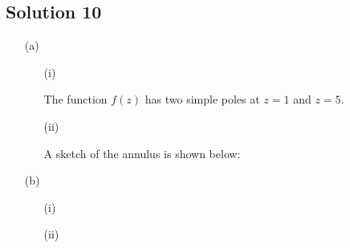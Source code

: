 \subsection*{Solution 10}

\begin{itemize}
\item[(a)]

\begin{itemize}

\item[(i)]

The function $f(z)$ has two simple poles at $z=1$ and $z=5$.

\item[(ii)]

A sketch of the annulus is shown below:



\todo
\end{itemize}

\item[(b)]

\begin{itemize}
\item[(i)]
\todo
\item[(ii)]
\todo
\end{itemize}

\end{itemize}

